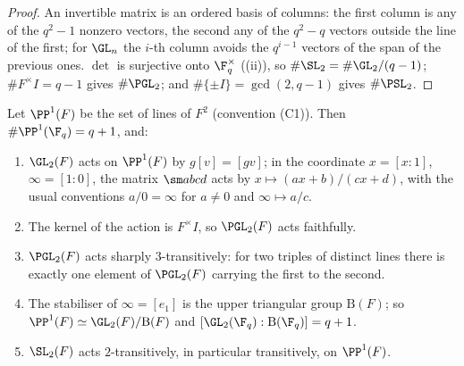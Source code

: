\begin{proof}
An invertible matrix is an ordered basis of columns: the first column is any of the $q^2-1$ nonzero vectors, the second any of the $q^2-q$ vectors
outside the line of the first; for $\GL_n$ the $i$-th column avoids the $q^{i-1}$ vectors of the span of the previous ones. $\det$ is surjective onto
$\F_q^\times$ ((ii)), so $\#\SL_2=\#\GL_2/(q-1)$; $\#F^\times I=q-1$ gives $\#\PGL_2$; and $\#\{\pm I\}=\gcd(2,q-1)$ gives $\#\PSL_2$.
\end{proof}

\begin{proposition}\label{prop:groups:projline}
Let $\PP^1(F)$ be the set of lines of $F^2$ (convention (C1)). Then $\#\PP^1(\F_q)=q+1$, and:
\begin{enumerate}[label=(\roman*)]
\item $\GL_2(F)$ acts on $\PP^1(F)$ by $g[v]=[gv]$; in the coordinate $x=[x:1]$, $\infty=[1:0]$, the matrix $\sm abcd$ acts by $x\mapsto(ax+b)/(cx+d)$,
with the usual conventions $a/0=\infty$ for $a\ne0$ and $\infty\mapsto a/c$.
\item The kernel of the action is $F^\times I$, so $\PGL_2(F)$ acts faithfully.
\item $\PGL_2(F)$ acts sharply $3$-transitively: for two triples of distinct lines there is exactly one element of $\PGL_2(F)$ carrying the first to
the second.
\item The stabiliser of $\infty=[e_1]$ is the upper triangular group $\mathrm B(F)$; so $\PP^1(F)\simeq\GL_2(F)/\mathrm B(F)$ and $[\GL_2(\F_q):\mathrm B(\F_q)]=q+1$.
\item $\SL_2(F)$ acts $2$-transitively, in particular transitively, on $\PP^1(F)$.
\end{enumerate}
\end{proposition}

